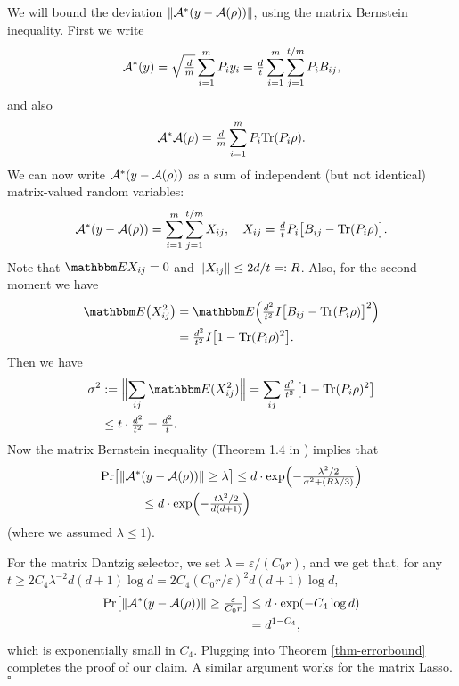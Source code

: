 We will bound the deviation $\lVert\mathcal{A}^*(y-\mathcal{A}(\rho))\rVert$, using the matrix Bernstein inequality.  First we write 
\begin{equation}
	\mathcal{A}^*(y) = \sqrt{\tfrac{d}{m}} \sum_{i=1}^m P_i y_i
	 = \tfrac{d}{t} \sum_{i=1}^m \sum_{j=1}^{t/m} P_i B_{ij}, 
\end{equation}
and also
\begin{equation}
	\mathcal{A}^*\mathcal{A}(\rho) = \tfrac{d}{m} \sum_{i=1}^m P_i \mathrm{Tr}(P_i\rho).
\end{equation}
We can now write $\mathcal{A}^*(y-\mathcal{A}(\rho))$ as a sum of independent (but not identical) matrix-valued random variables:
\begin{equation}
	\mathcal{A}^*(y-\mathcal{A}(\rho)) = \sum_{i=1}^m \sum_{j=1}^{t/m} X_{ij}, \quad
	X_{ij} = \tfrac{d}{t} P_i \bigl[B_{ij} - \mathrm{Tr}(P_i\rho)\bigr].
\end{equation}
Note that $\EE X_{ij} = 0$ and $\lVert X_{ij}\rVert \leq 2d/t =: R$.  Also, for the second moment we have 
\begin{equation}
	\begin{split}
	\EE\bigl(X_{ij}^2\bigr) &= \EE\Bigl(\tfrac{d^2}{t^2} I \bigl[B_{ij} - \Tr(P_i\rho)\bigr]^2\Bigr) \\
	 &= \tfrac{d^2}{t^2} I \bigl[1 - \Tr(P_i\rho)^2\bigr].
	\end{split}
\end{equation}
Then we have
\begin{equation}
	\begin{split}
	\sigma^2
	 &:= \Bigl\lVert \sum_{ij} \EE(X_{ij}^2) \Bigr\rVert = \sum_{ij} \tfrac{d^2}{t^2} \bigl[1 - \Tr(P_i\rho)^2\bigr] \\
	 &\leq t \cdot \tfrac{d^2}{t^2} = \tfrac{d^2}{t}.
	\end{split}
\end{equation}
Now the matrix Bernstein inequality (Theorem 1.4 in \cite{Tropp2010}) implies that 
\begin{equation}
	\begin{split}
	\Pr\bigl[\lVert\mathcal{A}^*&(y-\mathcal{A}(\rho))\rVert \geq \lambda\bigr]
	 \leq d\cdot \exp\Bigl( -\tfrac{\lambda^2/2}{\sigma^2 + (R\lambda/3)} \Bigr) \\
	 &\leq d\cdot \exp\Bigl( -\tfrac{t\lambda^2/2}{d(d+1)} \Bigr)
	\end{split}
\end{equation}
(where we assumed $\lambda \leq 1$). 

For the matrix Dantzig selector, we set $\lambda = \varepsilon/(C_0 r)$, and we get that, for any $t \geq 2 C_4 \lambda^{-2} d(d+1) \log d = 2 C_4 (C_0 r/\varepsilon)^2 d(d+1) \log d$, 
\begin{equation}
	\begin{split}
	\Pr\bigl[\lVert\mathcal{A}^*(y-\mathcal{A}(\rho))\rVert \geq \tfrac{\varepsilon}{C_0 r}\bigr]
	 &\leq d\cdot \exp(-C_4 \log d) \\
	 &= d^{1-C_4},
	\end{split}
\end{equation}
which is exponentially small in $C_4$.  Plugging into Theorem \ref{thm-errorbound} completes the proof of our claim.  A similar argument works for the matrix Lasso.  $\square$

